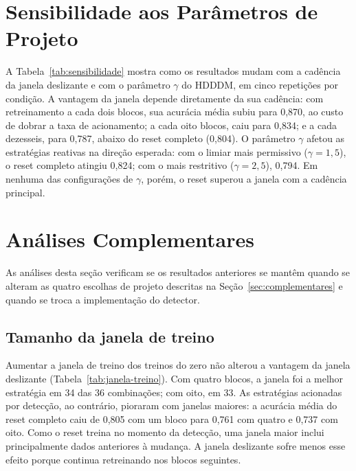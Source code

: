 \section{Sensibilidade aos Parâmetros de Projeto}
\label{sec:res_sensibilidade}

A Tabela~\ref{tab:sensibilidade} mostra como os resultados mudam com a
cadência da janela deslizante e com o parâmetro $\gamma$ do HDDDM, em cinco
repetições por condição. A vantagem da janela depende diretamente da sua
cadência: com retreinamento a cada dois blocos, sua acurácia média subiu
para 0,870, ao custo de dobrar a taxa de acionamento; a cada oito blocos,
caiu para 0,834; e a cada dezesseis, para 0,787, abaixo do reset completo
(0,804). O parâmetro $\gamma$ afetou as estratégias reativas na direção
esperada: com o limiar mais permissivo ($\gamma = 1{,}5$), o reset
completo atingiu 0,824; com o mais restritivo ($\gamma = 2{,}5$), 0,794.
Em nenhuma das configurações de $\gamma$, porém, o reset superou a janela
com a cadência principal.



\section{Análises Complementares}
\label{sec:res_complementares}

As análises desta seção verificam se os resultados anteriores se mantêm
quando se alteram as quatro escolhas de projeto descritas na
Seção~\ref{sec:complementares} e quando se troca a implementação do
detector.

\subsection{Tamanho da janela de treino}

Aumentar a janela de treino dos treinos do zero não alterou a vantagem da
janela deslizante (Tabela~\ref{tab:janela-treino}). Com quatro blocos, a
janela foi a melhor estratégia em 34 das 36 combinações; com oito, em 33. As
estratégias acionadas por detecção, ao contrário, pioraram com janelas
maiores: a acurácia média do reset completo caiu de 0,805 com um bloco para
0,761 com quatro e 0,737 com oito. Como o reset treina no momento da
detecção, uma janela maior inclui principalmente dados anteriores à
mudança. A janela deslizante sofre menos esse efeito porque continua
retreinando nos blocos seguintes.




